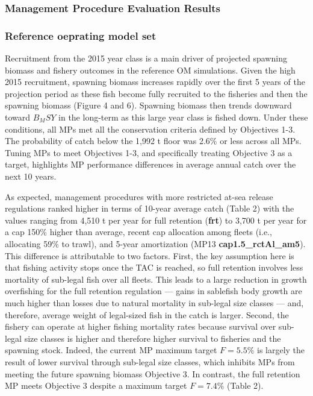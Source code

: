 \documentclass[11pt]{book}
\begin{document}
\hypertarget{management-procedure-evaluation-results}{%
\subsubsection{Management Procedure Evaluation Results}\label{management-procedure-evaluation-results}}

\hypertarget{reference-oeprating-model-set}{%
\subsubsection{Reference oeprating model set}\label{reference-oeprating-model-set}}

Recruitment from the 2015 year class is a main driver of projected spawning biomass and fishery outcomes in the reference OM simulations. Given the high 2015 recruitment, spawning biomass increases rapidly over the first 5 years of the projection period as these fish become fully recruited to the fisheries and then the spawning biomass (Figure 4 and 6). Spawning biomass then trends downward toward \(B_MSY\) in the long-term as this large year class is fished down. Under these conditions, all MPs met all the conservation criteria defined by Objectives 1-3. The probability of catch below the 1,992 t floor was 2.6\% or less across all MPs. Tuning MPs to meet Objectives 1-3, and specifically treating Objective 3 as a target, highlights MP performance differences in average annual catch over the next 10 years.

As expected, management procedures with more restricted at-sea release regulations ranked higher in terms of 10-year average catch (Table 2) with the values ranging from 4,510 t per year for full retention (\textbf{frt}) to 3,700 t per year for a cap 150\% higher than average, recent cap allocation among fleets (i.e., allocating 59\% to trawl), and 5-year amortization (MP13 \textbf{cap1.5\_rctAl\_am5}). This difference is attributable to two factors. First, the key assumption here is that fishing activity stops once the TAC is reached, so full retention involves less mortality of sub-legal fish over all fleets. This leads to a large reduction in growth overfishing for the full retention regulation --- gains in sablefish body growth are much higher than losses due to natural mortality in sub-legal size classes --- and, therefore, average weight of legal-sized fish in the catch is larger. Second, the fishery can operate at higher fishing mortality rates because survival over sub-legal size classes is higher and therefore higher survival to fisheries and the spawning stock. Indeed, the current MP maximum target \(F=5.5\%\) is largely the result of lower survival through sub-legal size classes, which inhibits MPs from meeting the future spawning biomass Objective 3. In contrast, the full retention MP meets Objective 3 despite a maximum target \(F=7.4\%\) (Table 2).
\end{document}

